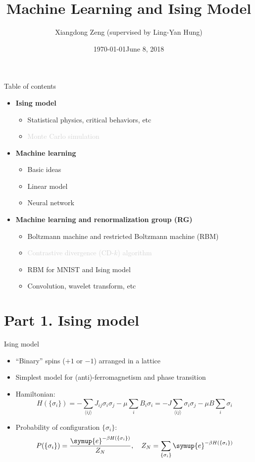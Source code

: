 \documentclass[aspectratio=169]{beamer}
\title{Machine Learning and Ising Model}
\date{\today}
\author{Xiangdong Zeng (supervised by Ling-Yan Hung)}
\institute{Department of Physics, Fudan University}
\date{June 8, 2018}
\def\ee{{\symup{e}}}
\def\nearest#1{\langle#1\rangle}
\def\q#1{{\{#1\}}}
\def\CDk{CD-$k$}
\begin{document}
\maketitle

\begin{frame}{Table of contents}
\begin{itemize}
  \item \textbf{Ising model}
    \begin{itemize}
      \item Statistical physics, critical behaviors, etc
      \item \textcolor{lightgray}{Monte Carlo simulation}
    \end{itemize}
  \item \textbf{Machine learning}
    \begin{itemize}
      \item Basic ideas
      \item Linear model
      \item Neural network
    \end{itemize}
  \item \textbf{Machine learning and renormalization group (RG)}
    \begin{itemize}
      \item Boltzmann machine and restricted Boltzmann machine (RBM)
      \item \textcolor{lightgray}{Contrastive divergence (\CDk{}) algorithm}
      \item RBM for MNIST and Ising model
      \item Convolution, wavelet transform, etc
    \end{itemize}
\end{itemize}
\end{frame}

\section{Part 1. Ising model}

\begin{frame}{Ising model}
\begin{itemize}
  \item ``Binary'' spins ($+1$ or $-1$) arranged in a lattice
  \item Simplest model for (anti)-ferromagnetism and phase transition
  \item Hamiltonian:
    \[
      H(\q{\sigma_i}) = -\sum_{\nearest{ij}} J_{ij}\sigma_i\sigma_j - \mu \sum_{i} B_i\sigma_i
                      = -J \sum_{\nearest{ij}} \sigma_i\sigma_j - \mu B \sum_{i} \sigma_i
    \]
  \item Probability of configuration $\q{\sigma_i}$:
    \[
      P(\q{\sigma_i}) = \frac{\ee^{-\beta H(\q{\sigma_i})}}{Z_N} \qc
      Z_N = \sum_\q{\sigma_i} \ee^{-\beta H(\q{\sigma_i})}
    \]
\end{itemize}
\end{frame}
\end{document}
